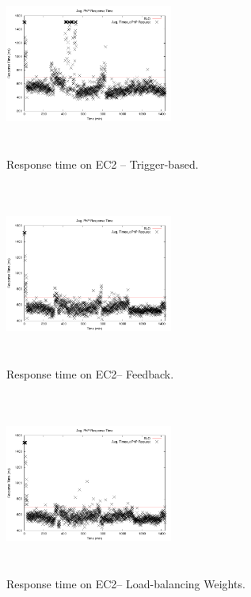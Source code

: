 \begin{figure}
\begin{center}
\includegraphics[width=0.49\textwidth, height=6cm]{./images/heterogeneous/avgTimeout_PhP_trigger}
\end{center}
\vspace{-5mm}
\caption{Response time on EC2 -- Trigger-based.}
\label{naiveEC2}
\end{figure}


\begin{figure}
\begin{center}
\includegraphics[width=0.49\textwidth, height=6cm]{./images/heterogeneous/avgTimeout_PhP_feedback}
\end{center}
\vspace{-5mm}
\caption{Response time on EC2-- Feedback.}
\label{historyEC2}
\end{figure}

\begin{figure}
\begin{center}
\includegraphics[width=0.49\textwidth, height=6cm]{./images/heterogeneous/avgTimeout_PhP_DLBweights}
\end{center}
\vspace{-5mm}
\caption{Response time on EC2-- Load-balancing Weights.}
\label{historyWeightEC2}
\end{figure}


